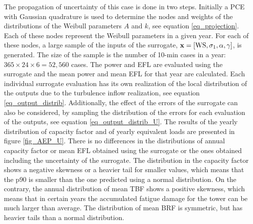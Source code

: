 \documentclass[preprint,12pt]{elsarticle}
\begin{document}
The propagation of uncertainty of this case is done in two steps. Initially a PCE with Gaussian quadrature is used to determine the nodes and weights of the distributions of the Weibull parameters $A$ and $k$, see equation \ref{eq_projection}. Each of these nodes represent the Weibull parameters in a given year. For each of these nodes, a large sample of the inputs of the surrogate, $\mathbf{x}=[\text{WS}, \sigma_{1}, \alpha, \gamma]$, is generated. The size of the sample is the number of 10-min cases in a year: $365\times24\times6=52,560$ cases. The power and EFL are evaluated using the surrogate and the mean power and mean EFL for that year are calculated. Each individual surrogate evaluation has its own realization of the local distribution of the outputs due to the turbulence inflow realization, see equation \ref{eq_output_distrib}. Additionally, the effect of the errors of the surrogate can also be considered, by sampling the distribution of the errors for each evaluation of the outputs, see equation \ref{eq_output_distrib_U}. The results of the yearly distribution of capacity factor and of yearly equivalent loads are presented in figure \ref{fig_AEP_U}. There is no differences in the distributions of annual capacity factor or mean EFL obtained using the surrogate or the ones obtained including the uncertainty of the surrogate. The distribution in the capacity factor shows a negative skewness or a heavier tail for smaller values, which means that the p90 is smaller than the one predicted using a normal distribution. On the contrary, the annual distribution of mean TBF shows a positive skewness, which means that in certain years the accumulated fatigue damage for the tower can be much larger than average. The distribution of mean BRF is symmetric, but has heavier tails than a normal distribution.
\end{document}
